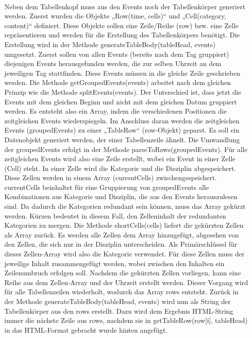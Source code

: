 {\\
Neben dem Tabellenkopf muss aus den Events noch der Tabellenkörper generiert werden. Zuerst wurden die Objekte „Row(time, cells)“ und „Cell(category, content)“ definiert. Diese Objekte sollen eine Zeile/Reihe (row) bzw. eine Zelle repräsentieren und werden für die Erstellung des Tabellenkörpers benötigt. 
Die Erstellung wird in der Methode generateTableBody(tableHead, events) umgesetzt. Zuerst sollen von allen Events (bereits nach dem Tag gruppiert) diejenigen Events herausgefunden werden, die zur selben Uhrzeit an dem jeweiligen Tag stattfinden. Diese Events müssen in die gleiche Zeile geschrieben werden. Die Methode getGroupedEvents(events) arbeitet nach dem gleichen Prinzip wie die Methode splitEvents(events). Der Unterschied ist, dass jetzt die Events mit dem gleichen Beginn und nicht mit dem gleichen Datum gruppiert werden. Es entsteht also ein Array, indem die verschiedenen Positionen die zeitgleichen Events wiederspiegeln.
Im Anschluss daran werden die zeitgleichen Events (groupedEvents) zu einer „TableRow“ (row-Objekt) geparst. Es soll ein Datenobjekt generiert werden, der einer Tabellenzeile ähnelt. Die Umwandlung der groupedEvents erfolgt in der Methode parseToRows(groupedEvents). Für alle zeitgleichen Events wird also eine Zeile erstellt, wobei ein Event in einer Zelle (Cell) steht. In einer Zelle wird die Kategorie und die Disziplin abgespeichert. Diese Zellen werden in einem Array (currentCells) zwischengespeichert. currentCells beinhaltet für eine Gruppierung von groupedEvents alle Kombinationen aus Kategorie und Disziplin, die aus den Events herauszulesen sind. Da dadurch die Kategorien redundant sein können, muss das Array gekürzt werden. Kürzen bedeutet in diesem Fall, den Zelleninhalt der redundanten Kategorien zu mergen.
Die Methode shortCells(cells) liefert die gekürzten Zellen als Array zurück. Es werden alle Zellen dem Array hinzugefügt, abgesehen von den Zellen, die sich nur in der Disziplin unterscheiden. Als Primärschlüssel für dieses Zellen-Array wird also die Kategorie verwendet. Für diese Zellen muss der jeweilige Inhalt zusammengefügt werden, wobei zwischen den Inhalten ein Zeilenumbruch erfolgen soll. 
Nachdem die gekürzten Zellen vorliegen, kann eine Reihe aus dem Zellen-Array und der Uhrzeit erstellt werden. Dieser Vorgang wird für alle Tabellenzeilen wiederholt, wodurch das Array rows entsteht.
Zurück in der Methode generateTableBody(tableHead, events) wird nun als String der Tabellenkörper aus den rows erstellt. Dazu wird dem Ergebnis HTML-String immer die nächste Zeile aus rows, nachdem sie in getTableRow(row[i], tableHead) in das HTML-Format gebracht wurde hinten angefügt.
}
